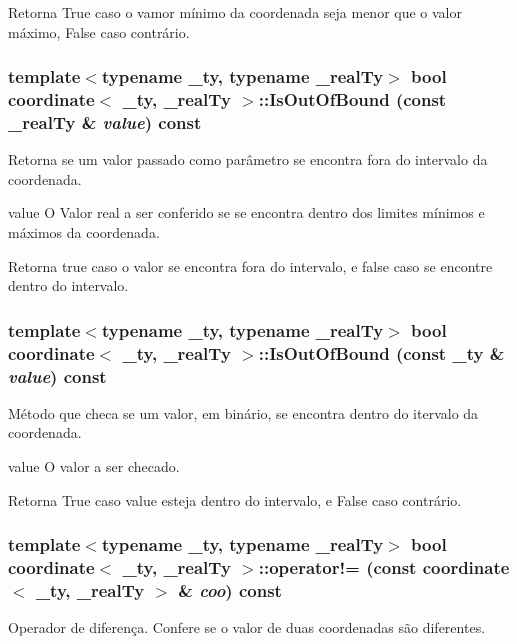 \begin{DoxyReturn}{Retorna}
True caso o vamor mínimo da coordenada seja menor que o valor máximo, False caso contrário. 
\end{DoxyReturn}
\hypertarget{classcoordinate_a5c05c89e4d5f69ea15ae724e2494bc6c}{
\subsubsection[{IsOutOfBound}]{\setlength{\rightskip}{0pt plus 5cm}template$<$typename \_\-ty, typename \_\-realTy$>$ bool {\bf coordinate}$<$ \_\-ty, \_\-realTy $>$::IsOutOfBound (const \_\-realTy \& {\em value}) const}}
\label{classcoordinate_a5c05c89e4d5f69ea15ae724e2494bc6c}
Retorna se um valor passado como parâmetro se encontra fora do intervalo da coordenada.

value O Valor real a ser conferido se se encontra dentro dos limites mínimos e máximos da coordenada.

\begin{DoxyReturn}{Retorna}
true caso o valor se encontra fora do intervalo, e false caso se encontre dentro do intervalo. 
\end{DoxyReturn}
\hypertarget{classcoordinate_aa39b86f0c5c09bf06fd5b2b8655d4dc2}{
\subsubsection[{IsOutOfBound}]{\setlength{\rightskip}{0pt plus 5cm}template$<$typename \_\-ty, typename \_\-realTy$>$ bool {\bf coordinate}$<$ \_\-ty, \_\-realTy $>$::IsOutOfBound (const \_\-ty \& {\em value}) const}}
\label{classcoordinate_aa39b86f0c5c09bf06fd5b2b8655d4dc2}
Método que checa se um valor, em binário, se encontra dentro do itervalo da coordenada.

value O valor a ser checado.

\begin{DoxyReturn}{Retorna}
True caso value esteja dentro do intervalo, e False caso contrário. 
\end{DoxyReturn}
\hypertarget{classcoordinate_a8254401d37f6be169cafb28ba10635c3}{
\subsubsection[{operator!=}]{\setlength{\rightskip}{0pt plus 5cm}template$<$typename \_\-ty, typename \_\-realTy$>$ bool {\bf coordinate}$<$ \_\-ty, \_\-realTy $>$::operator!= (const {\bf coordinate}$<$ \_\-ty, \_\-realTy $>$ \& {\em coo}) const}}
\label{classcoordinate_a8254401d37f6be169cafb28ba10635c3}
Operador de diferença. Confere se o valor de duas coordenadas são diferentes.

